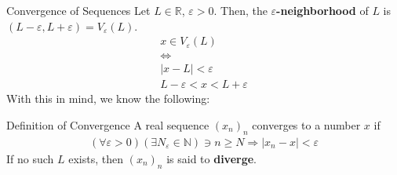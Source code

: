\documentclass[8pt]{extarticle}
\newcommand{\N}{\mathbb{N}}
\newcommand{\R}{\mathbb{R}}
\begin{document}
  \begin{problem}{Convergence of Sequences}
    Let $L\in\R$, $\varepsilon > 0$. Then, the $\varepsilon$\textbf{-neighborhood} of $L$ is $(L-\varepsilon, L+\varepsilon) = V_{\varepsilon}(L)$.
    \begin{align*}
      x\in V_{\varepsilon}(L)\\
      \Leftrightarrow\\
      |x-L| < \varepsilon\\
      L-\varepsilon < x < L+\varepsilon
    \end{align*}
    With this in mind, we know the following:
    \begin{problem}{Definition of Convergence}
      A real sequence $(x_n)_n$ converges to a number $x$ if 
      \begin{align*}
        \left(\forall \varepsilon > 0\right)\left(\exists N_{\varepsilon}\in\N\right) \ni n\geq N \Rightarrow |x_n-x| < \varepsilon
      \end{align*}
      If no such $L$ exists, then $(x_n)_n$ is said to \textbf{diverge}.\\


\end{problem}
\end{problem}
\end{document}
